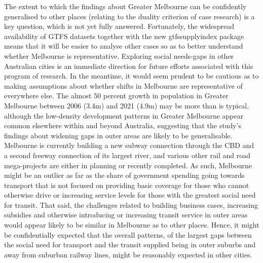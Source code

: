 \documentclass[preprint, 3p,
authoryear]{elsarticle} %
\begin{document}
The extent to which the findings about Greater Melbourne can be
confidently generalised to other places (relating to the duality
criterion of case research) is a key question, which is not yet fully
answered. Fortunately, the widespread availability of GTFS datasets
together with the new gtfssupplyindex package means that it will be
easier to analyse other cases so as to better understand whether
Melbourne is representative. Exploring social needs-gaps in other
Australian cities is an immediate direction for future efforts
associated with this program of research. In the meantime, it would seem
prudent to be cautious as to making assumptions about whether shifts in
Melbourne are representative of everywhere else. The almost 50 percent
growth in population in Greater Melbourne between 2006 (3.4m) and 2021
(4.9m) may be more than is typical, although the low-density development
patterns in Greater Melbourne appear common elsewhere within and beyond
Australia, suggesting that the study's findings about widening gaps in
outer areas are likely to be generalisable. Melbourne is currently
building a new subway connection through the CBD and a second freeway
connection of its largest river, and various other rail and road
mega-projects are either in planning or recently completed. As such,
Melbourne might be an outlier as far as the share of government spending
going towards transport that is not focused on providing basic coverage
for those who cannot otherwise drive or increasing service levels for
those with the greatest social need for transit. That said, the
challenges related to building business cases, increasing subsidies and
otherwise introducing or increasing transit service in outer areas would
appear likely to be similar in Melbourne as to other places. Hence, it
might be confidentially expected that the overall patterns, of the
largest gaps between the social need for transport and the transit
supplied being in outer suburbs and away from suburban railway lines,
might be reasonably expected in other cities.
\end{document}
